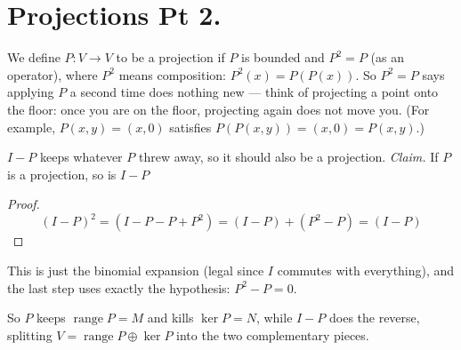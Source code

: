 \documentclass[11pt]{article}
\newcommand{\1}{\mathbf{1}}
\DeclareMathOperator{\range}{range}
\theoremstyle{notestyle}
\theoremstyle{definition}
\begin{document}
\section{Projections Pt 2.}
We define $P : V\rightarrow V$ to be a projection if $P$ is bounded and $P^2 = P$ (as an
operator), where $P^2$ means composition: $P^2(x) = P(P(x))$.
So $P^2 = P$ says applying $P$ a second time does nothing new --- think of projecting a
point onto the floor: once you are on the floor, projecting again does not move you.
(For example, $P(x, y) = (x, 0)$ satisfies $P(P(x,y)) = (x,0) = P(x,y)$.)
\par $I - P$ keeps whatever $P$ threw away, so it should also be a projection.
\noindent\textit{Claim.} If $P$ is a projection, so is $I - P$
\begin{proof}
    $$(I - P)^2 = (I - P  - P + P^2) = (I - P) + (P^2 - P) = (I - P)$$
\end{proof}
This is just the binomial expansion (legal since $I$ commutes with everything), and the
last step uses exactly the hypothesis: $P^2 - P = 0$.

\begin{center}
\end{center}

So $P$ keeps $\range P = M$ and kills $\ker P = N$, while $I - P$ does the
reverse, splitting $V = \range P \oplus \ker P$ into the two complementary pieces.
\end{document}

